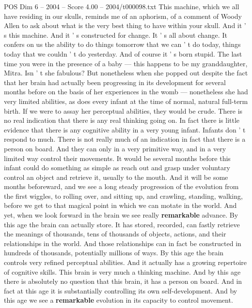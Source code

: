 \begin{textsample}{POS Dim 6 – 2004 – Score 4.00 – 2004/t000098.txt}  \label{ex:f6_pos_026}
This machine, which we all have residing in our skulls, reminds me of an aphorism, of a comment of Woody Allen to ask about what is the very best thing to have within your skull.
And it ' s this machine.
And it ' s constructed for change.
It ' s all about change.
It confers on us the ability to do things tomorrow that we can ' t do today, things today that we couldn ' t do yesterday.
And of course it ' s born stupid.
The last time you were in the presence of a baby — this happens to be my granddaughter, Mitra.
Isn ' t she fabulous?
But nonetheless when she popped out despite the fact that her brain had actually been progressing in its development for several months before on the basis of her experiences in the womb — nonetheless she had very limited abilities, as does every infant at the time of normal, natural full-term birth.
If we were to assay her perceptual abilities, they would be crude.
There is no real indication that there is any real thinking going on.
In fact there is little evidence that there is any cognitive ability in a very young infant.
Infants don ' t respond to much.
There is not really much of an indication in fact that there is a person on board.
And they can only in a very primitive way, and in a very limited way control their movements.
It would be several months before this infant could do something as simple as reach out and grasp under voluntary control an object and retrieve it, usually to the mouth.
And it will be some months beforeward, and we see a long steady progression of the evolution from the first wiggles, to rolling over, and sitting up, and crawling, standing, walking, before we get to that magical point in which we can motate in the world.
And yet, when we look forward in the brain we see really \textbf{remarkable} advance.
By this age the brain can actually store.
It has stored, recorded, can fastly retrieve the meanings of thousands, tens of thousands of objects, actions, and their relationships in the world.
And those relationships can in fact be constructed in hundreds of thousands, potentially millions of ways.
By this age the brain controls very refined perceptual abilities.
And it actually has a growing repertoire of cognitive skills.
This brain is very much a thinking machine.
And by this age there is absolutely no question that this brain, it has a person on board.
And in fact at this age it is substantially controlling its own self-development.
And by this age we see a \textbf{remarkable} evolution in its capacity to control movement.

\end{textsample}
